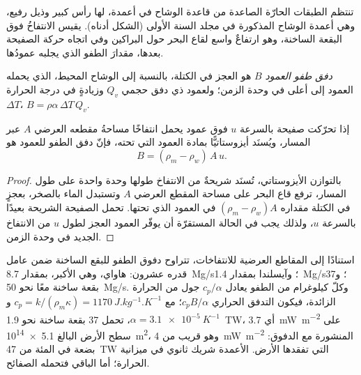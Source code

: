 تنتظم الطبقات الحارّة الصاعدة من قاعدة الوشاح في أعمدة، لها رأس كبير
وذيل رفيع، وهي أعمدة الوشاح المذكورة في مجلد السنة الأولى (الشكل أدناه).
يقيس الانتفاخُ فوق البقعة الساخنة، وهو ارتفاعٌ واسع لقاع البحر حول البراكين
وفي اتجاه حركة الصفيحة بعدها، مقدارَ الطفو الذي يجلبه عمودُها.

\begin{definition}\label{def:b3:mantle-convection:buoyancy-flux}
\emph{دفق طفو العمود} $B$ هو العجز في الكتلة، بالنسبة إلى الوشاح المحيط،
الذي يحمله العمود إلى أعلى في وحدة الزمن؛
ولعمود ذي دفق حجمي $Q_v$ وزيادةٍ في درجة الحرارة $\Delta T$،
$B = \rho\alpha\,\Delta T\,Q_v$.
\end{definition}

\begin{proposition}\label{prop:b3:mantle-convection:swell}
إذا تحرّكت صفيحة بالسرعة $u$ فوق عمود يحمل انتفاخًا
مساحةُ مقطعه العرضي $A$ عبر المسار، ويُسنَد أيزوستاتيًّا بمادة العمود التي تحته،
فإنّ دفق الطفو للعمود هو
\[
  B = (\rho_m - \rho_w)\,A\,u .
\]
\end{proposition}

\begin{proof}
بالتوازن الأيزوستاتي، تُسنَد شريحةٌ من الانتفاخ طولها وحدة واحدة على طول المسار،
ترفع قاع البحر على مساحة المقطع العرضي $A$ وتستبدل الماء بالصخر،
بعجزٍ في الكتلة مقداره $(\rho_m - \rho_w)A$ في العمود الذي تحتها.
تحمل الصفيحة الشريحة بعيدًا بالسرعة $u$، ولذلك يجب في الحالة المستقرّة
أن يوفّر العمود العجز لطول $u$ من الانتفاخ الجديد في وحدة الزمن.
\end{proof}

استنادًا إلى المقاطع العرضية للانتفاخات، تتراوح دفوق الطفو للبقع الساخنة ضمن عامل قدره عشرون:
هاواي، وهي الأكبر، بمقدار \qty{8.7}{Mg/s}؛ وآيسلندا بمقدار \qty{1.4}{Mg/s}؛
و37 بقعة ساخنة معًا نحو \qty{50}{Mg/s}. وكلّ كيلوغرام من الطفو يعادل
$c_p/\alpha$ جول من الحرارة الزائدة، فيكون التدفق الحراري $c_pB/\alpha$؛
مع $c_p = k/(\rho_m\kappa) = \qty{1170}{J.kg^{-1}.K^{-1}}$ و$\alpha =
\qty{3.1e-5}{K^{-1}}$، تحمل 37 بقعة ساخنة نحو \qty{1.9}{TW}، أي
\qty{3.7}{mW.m^{-2}} على سطح الأرض البالغ \qty{5.1e14}{m^2}، وهو قريب من
\qty{4}{mW.m^{-2}} المنشورة مع الدفوق: بضعة في المئة من
\qty{47}{TW} التي تفقدها الأرض. الأعمدة شريك ثانوي في
ميزانية الحرارة؛ أما الباقي فتحمله الصفائح.

